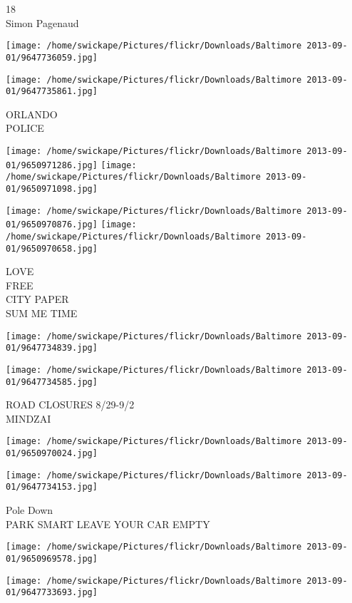 \documentclass[10pt,letterpaper]{article}
\begin{document}
18\\
Simon Pagenaud
\pagebreak

\texttt{[image: /home/swickape/Pictures/flickr/Downloads/Baltimore 2013-09-01/9647736059.jpg]}

\vspace{0.25in}
\texttt{[image: /home/swickape/Pictures/flickr/Downloads/Baltimore 2013-09-01/9647735861.jpg]}

ORLANDO\\
POLICE
\pagebreak

\texttt{[image: /home/swickape/Pictures/flickr/Downloads/Baltimore 2013-09-01/9650971286.jpg]}
\texttt{[image: /home/swickape/Pictures/flickr/Downloads/Baltimore 2013-09-01/9650971098.jpg]}

\texttt{[image: /home/swickape/Pictures/flickr/Downloads/Baltimore 2013-09-01/9650970876.jpg]}
\texttt{[image: /home/swickape/Pictures/flickr/Downloads/Baltimore 2013-09-01/9650970658.jpg]}

LOVE\\
FREE\\
CITY PAPER\\
SUM ME TIME
\pagebreak

\texttt{[image: /home/swickape/Pictures/flickr/Downloads/Baltimore 2013-09-01/9647734839.jpg]}

\vspace{0.25in}
\texttt{[image: /home/swickape/Pictures/flickr/Downloads/Baltimore 2013-09-01/9647734585.jpg]}

ROAD CLOSURES 8/29{-}9/2\\
MINDZAI
\pagebreak

\texttt{[image: /home/swickape/Pictures/flickr/Downloads/Baltimore 2013-09-01/9650970024.jpg]}

\vspace{0.25in}
\texttt{[image: /home/swickape/Pictures/flickr/Downloads/Baltimore 2013-09-01/9647734153.jpg]}

Pole Down\\
PARK SMART LEAVE YOUR CAR EMPTY
\pagebreak

\texttt{[image: /home/swickape/Pictures/flickr/Downloads/Baltimore 2013-09-01/9650969578.jpg]}

\vspace{0.25in}
\texttt{[image: /home/swickape/Pictures/flickr/Downloads/Baltimore 2013-09-01/9647733693.jpg]}
\end{document}
